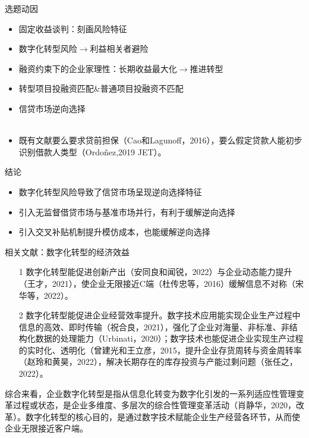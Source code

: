 \documentclass{beamer}
\begin{document}
\begin{frame}{选题动因}
	\begin{itemize}
		\item 固定收益谈判：刻画风险特征
		\item 数字化转型风险$\rightarrow$利益相关者避险
	    \item 融资约束下的企业家理性：长期收益最大化$\rightarrow$推进转型
		\item 转型项目投融资匹配\&普通项目投融资不匹配
		\item 信贷市场逆向选择
		\\ \hspace*{\fill} \\
		\item 既有文献要么要求贷前担保（Cao和Lagunoff，2016），要么假定贷款人能初步识别借款人类型（Ordoñez,2019 JET）。
    \end{itemize}
\end{frame}

\begin{frame}{结论}
	\begin{itemize}
		\item 数字化转型风险导致了信贷市场呈现逆向选择特征
		\item 引入无监督借贷市场与基准市场并行，有利于缓解逆向选择
		\item 引入交叉补贴机制提升模仿成本，也能缓解逆向选择
	\end{itemize}
\end{frame}

\begin{frame}{相关文献：数字化转型的经济效益}
	\begin{itemize}
		\item[1] 数字化转型能促进创新产出（安同良和闻锐，2022）与企业动态能力提升（王才，2021），使企业无限接近C端（杜传忠等，2016）缓解信息不对称（宋华等，2022）。
		\item[2] 数字化转型能促进企业经营效率提升。数字技术应用能实现企业生产过程中信息的高效、即时传输（祝合良，2021），强化了企业对海量、非标准、非结构化数据的处理能力（Urbinati，2020）；数字技术也能促进企业实现生产过程的实时化、透明化（曾建光和王立彦，2015，提升企业存货周转与资金周转率（赵玲和黄昊，2022），解决长期存在的库存投资与产能过剩问题（张任之，2022）。
	\end{itemize}
	综合来看，企业数字化转型是指从信息化转变为数字化引发的一系列适应性管理变革过程或状态，是企业多维度、多层次的综合性管理变革活动（肖静华，2020，改革）。数字化转型的核心目的，是通过数字技术赋能企业生产经营各环节，从而使企业无限接近客户端。
\end{frame}
\end{document}
